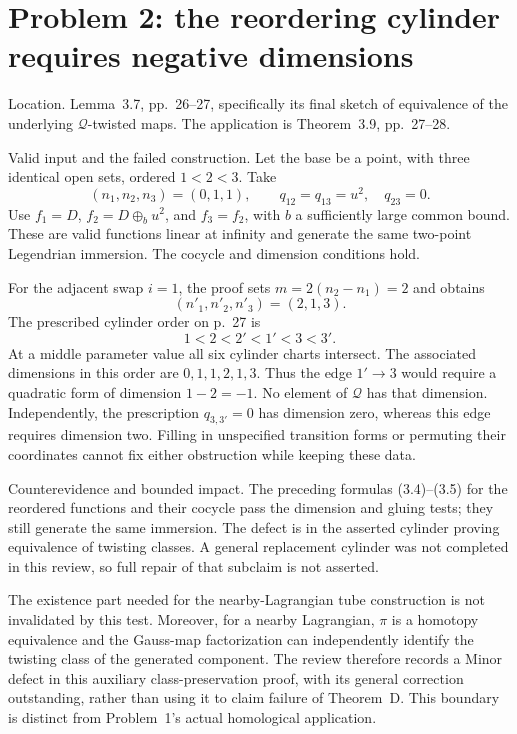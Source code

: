 \documentclass[10pt]{article}
\begin{document}
\section*{Problem 2: the reordering cylinder requires negative dimensions}
Location. Lemma 3.7, pp. 26–27, specifically its final sketch of equivalence of the underlying \(\mathcal Q\)-twisted maps. The application is Theorem 3.9, pp. 27–28.\par
Valid input and the failed construction. Let the base be a point, with three identical open sets, ordered \(1<2<3\). Take \[(n_1,n_2,n_3)=(0,1,1),\qquad
 q_{12}=q_{13}=u^2,\quad q_{23}=0.\] Use \(f_1=D\), \(f_2=D\oplus_b u^2\), and \(f_3=f_2\), with \(b\) a sufficiently large common bound. These are valid functions linear at infinity and generate the same two-point Legendrian immersion. The cocycle and dimension conditions hold.\par
For the adjacent swap \(i=1\), the proof sets \(m=2(n_2-n_1)=2\) and obtains \[(n'_1,n'_2,n'_3)=(2,1,3).\] The prescribed cylinder order on p. 27 is \[1<2<2'<1'<3<3'.\] At a middle parameter value all six cylinder charts intersect. The associated dimensions in this order are \(0,1,1,2,1,3\). Thus the edge \(1'\to3\) would require a quadratic form of dimension \(1-2=-1\). No element of \(\mathcal Q\) has that dimension. Independently, the prescription \(q_{3,3'}=0\) has dimension zero, whereas this edge requires dimension two. Filling in unspecified transition forms or permuting their coordinates cannot fix either obstruction while keeping these data.\par
Counterevidence and bounded impact. The preceding formulas (3.4)–(3.5) for the reordered functions and their cocycle pass the dimension and gluing tests; they still generate the same immersion. The defect is in the asserted cylinder proving equivalence of twisting classes. A general replacement cylinder was not completed in this review, so full repair of that subclaim is not asserted.\par
The existence part needed for the nearby-Lagrangian tube construction is not invalidated by this test. Moreover, for a nearby Lagrangian, \(\pi\) is a homotopy equivalence and the Gauss-map factorization can independently identify the twisting class of the generated component. The review therefore records a Minor defect in this auxiliary class-preservation proof, with its general correction outstanding, rather than using it to claim failure of Theorem D. This boundary is distinct from Problem 1’s actual homological application.\par
\end{document}

